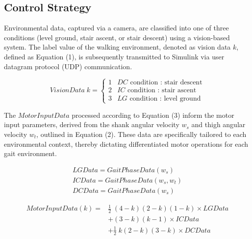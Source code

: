 \documentclass[actuators,article,accept,pdftex,moreauthors]{Definitions/mdpi}
\begin{document}
\subsection{Control Strategy}
Environmental data, captured via a camera, are classified into one of three conditions (level ground, stair ascent, or stair descent) using a vision-based system. The label value of the walking environment, denoted as vision data $k${, defined} as Equation (1), is subsequently transmitted to Simulink via user datagram protocol (UDP) communication.
\begin{linenomath}
\begin{equation}
\text{$VisionData$}\; k =\begin{cases} 
1 & \text{$DC$ condition : stair descent} \\ 
2 & \text{$IC$ condition : stair ascent} \\
3 & \text{$LG$ condition : level ground}
\end{cases}
\end{equation}
\end{linenomath}
The $MotorInputData$ processed according to Equation (3) inform the motor input parameters{, derived} from the shank angular velocity $w_s$ and thigh angular velocity $w_t$, outlined in Equation (2). These data are specifically tailored to each environmental context, thereby dictating differentiated motor operations for each gait environment.
\begin{linenomath}
\begin{equation}
\begin{aligned}
\text{$LGData=GaitPhaseData(w_s)$} \\
\text{$ICData=GaitPhaseData(w_s,w_t)$} \\
\text{$DCData=GaitPhaseData(w_s)$}
\end{aligned}
\end{equation}
\end{linenomath}

\begin{linenomath}
\begin{equation}
\begin{aligned}
\text{$MotorInputData$}(k) = & \frac{1}{2}\;(4-k)(2-k)(1-k) \times \text{$LGData$}\\
& + (3-k)(k-1) \times \text{$ICData$}\\
& + \frac{1}{2}\;k(2-k)(3-k) \times \text{$DCData$} 
\end{aligned}
\end{equation}
\end{linenomath}
\end{document}
